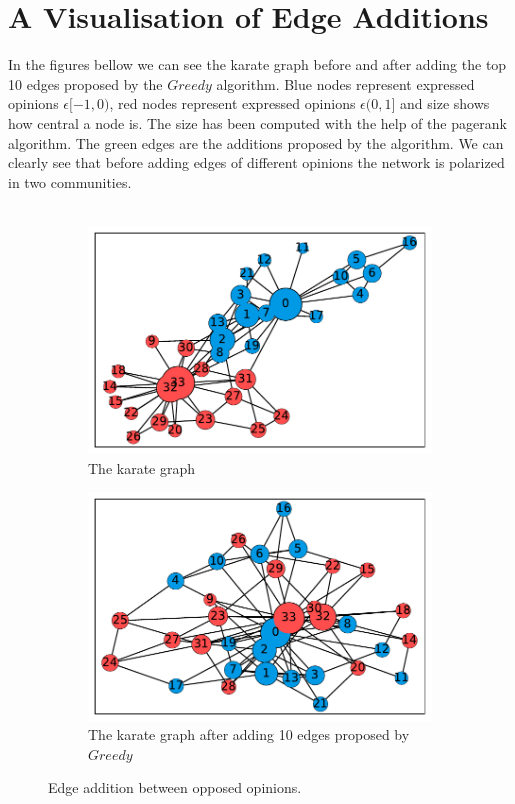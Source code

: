  \section{A Visualisation of Edge Additions}
\label{sec:vis}
In the figures bellow we can see the karate graph before and after adding the top 10 edges proposed by the $Greedy$ algorithm. Blue nodes represent expressed opinions $\epsilon [-1,0)$, red nodes represent expressed opinions $\epsilon (0,1]$ and size shows how central a node is. The size has been computed with the help of the pagerank algorithm. The green edges are the additions proposed by the algorithm. We can clearly see that before adding edges of different opinions the network is polarized in two communities.
\\
\\
\begin{figure}[!htbp]
	\centering
	\begin{subfigure}[t]{0.45\textwidth}
		\centering
		\includegraphics[height=0.2\textheight]{Figures/before_pol}
		\caption{The karate graph}
		\label{subfig:before_pol}
	\end{subfigure}
	\hfill
	\begin{subfigure}[t]{0.45\textwidth}
		\centering
		\captionsetup{justification=centering}
		\includegraphics[height=0.2\textheight]{Figures/after_pol}
		\caption{The karate graph after adding 10 edges proposed by $Greedy$}
		\label{subfig:after_pol}
	\end{subfigure}
	\vspace{20pt}
	\hfill
	\caption{Edge addition between opposed opinions.}
	\label{fig:top-10-karate}
\end{figure}
